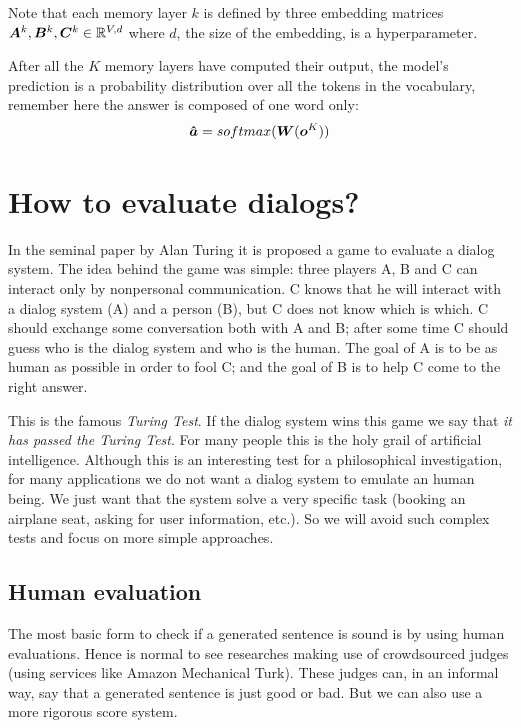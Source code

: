 Note that each memory layer $k$ is defined by three embedding matrices $\bm{A}^{k}, \bm{B}^{k}, \bm{C}^{k} \in \mathbb{R}^{V,d}$ where $d$, the size of the embedding, is a hyperparameter.

After all the $K$ memory layers have computed their output, the model's prediction is a probability distribution over all the tokens in the vocabulary, remember here the answer is composed of one word only:
\begin{equation}
\bm{\hat{a}}= softmax(\bm{W}(\bm{o}^{K}))
\end{equation}

\section{How to evaluate dialogs?}

\label{ch:03-eval}

In the seminal paper by Alan Turing \cite{Turing} it is proposed a game to evaluate a dialog system. The idea behind the game was simple: three players A, B and C can interact only by nonpersonal communication. C knows that he will interact with a dialog system (A) and a person (B), but C does not know which is which. C should exchange some conversation both with A and B; after some time C should guess who is the dialog system and who is the human. The goal of A is to be as human as possible in order to fool C; and the goal of B is to help C come to the right answer.

\par This is the famous \textit{Turing Test}. If the dialog system wins this game we say that \textit{it has passed the Turing Test}. For many people this is the holy grail of artificial intelligence. Although this is an interesting test for a philosophical investigation, for many applications we do not want a dialog system to emulate an human being. We just want that the system solve a very specific task (booking an airplane seat, asking for user information, etc.). So we will avoid such complex tests and focus on more simple approaches.


\subsection{Human evaluation}

The most basic form to check if a generated sentence is sound is by using human evaluations. Hence is normal to see researches making use of crowdsourced judges (using services like Amazon Mechanical Turk). These judges can, in an informal way,  say that a generated sentence is just good or bad. But we can also use a more rigorous score system. 


